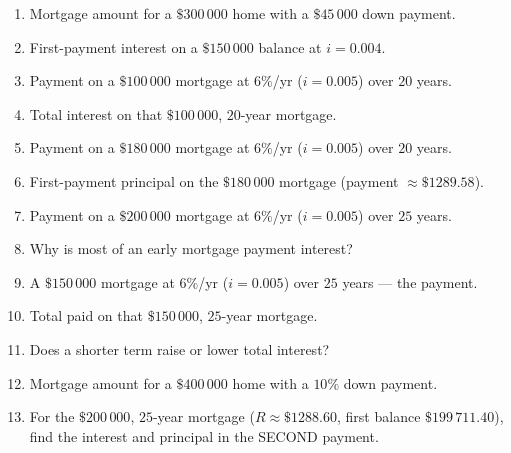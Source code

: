 \documentclass[11pt]{article}
\begin{document}
\begin{recapbox}
\begin{multicols}{2}
\small
\begin{enumerate}[leftmargin=*,itemsep=3pt]
  \item Mortgage amount for a $\$300\,000$ home with a $\$45\,000$ down payment.
  \item First-payment interest on a $\$150\,000$ balance at $i=0.004$.
  \item Payment on a $\$100\,000$ mortgage at $6\%$/yr ($i=0.005$) over $20$ years.
  \item Total interest on that $\$100\,000$, $20$-year mortgage.
  \item Payment on a $\$180\,000$ mortgage at $6\%$/yr ($i=0.005$) over $20$ years.
  \item First-payment principal on the $\$180\,000$ mortgage (payment $\approx\$1289.58$).
  \item Payment on a $\$200\,000$ mortgage at $6\%$/yr ($i=0.005$) over $25$ years.
  \item Why is most of an early mortgage payment interest?
  \item A $\$150\,000$ mortgage at $6\%$/yr ($i=0.005$) over $25$ years — the payment.
  \item Total paid on that $\$150\,000$, $25$-year mortgage.
  \item Does a shorter term raise or lower total interest?
  \item Mortgage amount for a $\$400\,000$ home with a $10\%$ down payment.
  \item For the $\$200\,000$, $25$-year mortgage ($R\approx\$1288.60$, first balance $\$199\,711.40$), find the interest and principal in the SECOND payment.
\end{enumerate}
\end{multicols}
\end{recapbox}
\end{document}
